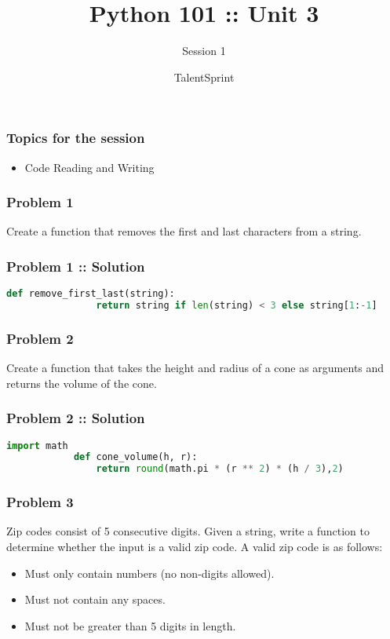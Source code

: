 \documentclass[14pt]{beamer}
\title{Python 101 :: Unit 3}
\subtitle{Session 1}
\date{}
\author[TS]{TalentSprint}
\begin{document}
    \begin{frame}
        \titlepage
    \end{frame}
    \begin{frame}
        \frametitle{Topics for the session}
        \begin{itemize}
            \item Code Reading and Writing
        \end{itemize}
    \end{frame}
    \begin{frame}
        \frametitle{Problem 1}
            Create a function that removes the first and last characters from a string.
    \end{frame}
    \begin{frame}[containsverbatim]
        \frametitle{Problem 1 :: Solution}
        \begin{lstlisting}[language=Python]
            def remove_first_last(string):
                return string if len(string) < 3 else string[1:-1]
        \end{lstlisting}
    \end{frame}
    \begin{frame}
        \frametitle{Problem 2}
        Create a function that takes the height and radius of a cone as arguments and returns the volume of the cone.
    \end{frame}
    \begin{frame}[containsverbatim]
        \frametitle{Problem 2 :: Solution}
        \begin{lstlisting}[language=Python]
            import math
            def cone_volume(h, r):
                return round(math.pi * (r ** 2) * (h / 3),2)
        \end{lstlisting}
    \end{frame}
    \begin{frame}
        \frametitle{Problem 3}
        Zip codes consist of 5 consecutive digits. Given a string, write a function to determine whether the input is a valid zip code. A valid zip code is as follows:
        \begin{itemize}
            \item Must only contain numbers (no non-digits allowed).
            \item Must not contain any spaces.
            \item Must not be greater than 5 digits in length.
        \end{itemize}
    \end{frame}
\end{document}
